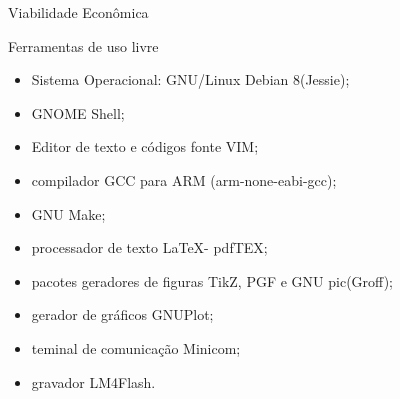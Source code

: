 \begin{frame}{Viabilidade Econômica}

Ferramentas de uso livre 
\begin{itemize}
\item Sistema Operacional: GNU/Linux Debian 8(Jessie);
\item GNOME Shell;
\item Editor de texto e códigos fonte VIM;
\item compilador GCC para ARM (arm-none-eabi-gcc);
\item GNU Make;
\item processador de texto \LaTeX - pdfTEX;
\item pacotes geradores de figuras TikZ, PGF e GNU pic(Groff);
\item gerador de gráficos GNUPlot;
\item teminal de comunicação Minicom;
\item gravador LM4Flash.
\end{itemize}

\end{frame}

